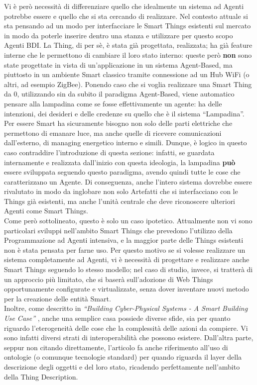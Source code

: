 \documentclass[12pt,a4paper,openright,oneside]{report}
\newcommand{\quotes}[1]{``#1''}
\begin{document}
Vi è però necessità di differenziare quello che idealmente un sistema ad Agenti potrebbe essere e quello che si sta cercando di realizzare. Nel contesto attuale si sta pensando ad un modo per interfacciare le Smart Things esistenti sul mercato in modo da poterle inserire dentro una stanza e utilizzare per questo scopo Agenti BDI. La Thing, di per sè, è stata già progettata, realizzata; ha già feature interne che le permettono di cambiare il loro stato interno: queste però \textbf{non} sono state progettate in vista di un'applicazione in un sistema Agent-Based, ma piuttosto in un ambiente Smart classico tramite connessione ad un Hub WiFi (o altri, ad esempio ZigBee).
Ponendo caso che si voglia realizzare una Smart Thing da 0, utilizzando sin da subito il paradigma Agent-Based, viene automatico pensare alla lampadina come se fosse effettivamente un agente: ha delle intenzioni, dei desideri e delle credenze su quello che è il sistema \quotes{Lampadina}. Per essere Smart ha sicuramente bisogno non solo delle parti elettriche che permettono di emanare luce, ma anche quelle di ricevere comunicazioni dall'esterno, di managing energetico interno e simili. Dunque, è logico in questo caso contraddire l'introduzione di questa sezione: infatti, se guardata internamente e realizzata dall'inizio con questa ideologia, la lampadina \textbf{può} essere sviluppata seguendo questo paradigma, avendo quindi tutte le cose che caratterizzano un Agente. Di conseguenza, anche l'intero sistema dovrebbe essere rivalutato in modo da inglobare non solo Artefatti che si interfacciano con le Things già esistenti, ma anche l'unità centrale che deve riconoscere ulteriori Agenti come Smart Things.\\

Come però sottolineato, questo è solo un caso ipotetico. Attualmente non vi sono particolari sviluppi nell'ambito Smart Things che prevedono l'utilizzo della Programmazione ad Agenti intensiva, e la maggior parte delle Things esistenti non è stata pensata per farne uso. Per questo motivo se si volesse realizzare un sistema completamente ad Agenti, vi è necessità di progettare e realizzare anche Smart Things seguendo lo stesso modello; nel caso di studio, invece, si tratterà di un approccio più limitato, che si baserà sull'adozione di Web Things opportunamente configurate e virtualizzate, senza dover inventare nuovi metodo per la creazione delle entità Smart.\\

Inoltre, come descritto in \textit{\quotes{Building Cyber-Physical Systems - A Smart Building Use Case}} \cite{smartbuilding}, anche una semplice casa possiede diverse sfide, sia per quanto riguardo l'eterogeneità delle cose che la complessità delle azioni da compiere. Vi sono infatti diversi strati di interoperabilità che possono esistere. Dall'altra parte, seppur non citando direttamente, l'articolo fa anche riferimento all'uso di ontologie (o comunque tecnologie standard) per quando riguarda il layer della descrizione degli oggetti e del loro stato, ricadendo perfettamente nell'ambito della Thing Description.
\end{document}
